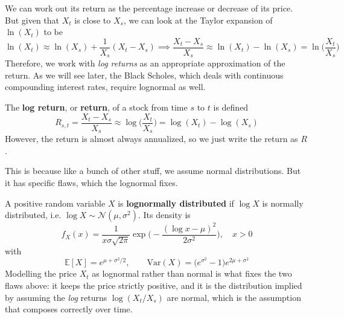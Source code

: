 \documentclass{article}
\begin{document}
    We can work out its return as the percentage increase or decrease of its price. But given that $X_t$ is close to $X_s$, we can look at the Taylor expansion of $\ln(X_t)$ to be 
    \begin{equation}
      \ln(X_t) \approx \ln(X_s) + \frac{1}{X_s} (X_t - X_s) \implies \frac{X_t - X_s}{X_s} \approx \ln (X_t) - \ln (X_s) = \ln \bigg( \frac{X_t}{X_s} \bigg)
    \end{equation}
    Therefore, we work with \textit{log returns} as an appropriate approximation of the return. As we will see later, the Black Scholes, which deals with continuous compounding interest rates, require lognormal as well. 

    \begin{definition}
      \label{def:log-return}
      The \textbf{log return}, or \textbf{return}, of a stock from time $s$ to $t$ is defined 
      \begin{equation}
        R_{s, t} = \frac{X_t - X_s}{X_s} \approx \log\bigg( \frac{X_t}{X_s} \bigg) = \log(X_t) - \log(X_s)
      \end{equation}
      However, the return is almost always annualized, so we just write the return as $R$. 
    \end{definition}

    \begin{question}[Lognormal]
      This is because like a bunch of other stuff, we assume normal distributions. But it has specific flaws, which the lognormal fixes. 
    \end{question}

    \begin{definition}
      \label{def:lognormal-distribution}
      A positive random variable $X$ is \textbf{lognormally distributed} if $\log X$ is normally distributed, i.e. $\log X \sim \mathcal{N}(\mu, \sigma^2)$. Its density is
      \begin{equation}
        f_X (x) = \frac{1}{x \sigma \sqrt{2\pi}} \exp \bigg( - \frac{(\log x - \mu)^2}{2 \sigma^2} \bigg), \quad x > 0
      \end{equation}
      with
      \begin{equation}
        \mathbb{E}[X] = e^{\mu + \sigma^2 / 2}, \qquad \mathrm{Var}(X) = \big( e^{\sigma^2} - 1 \big) e^{2 \mu + \sigma^2}
      \end{equation}
      Modelling the price $X_t$ as lognormal rather than normal is what fixes the two flaws above: it keeps the price strictly positive, and it is the distribution implied by assuming the \textit{log} returns $\log(X_t / X_s)$ are normal, which is the assumption that composes correctly over time. 
    \end{definition}
\end{document}

